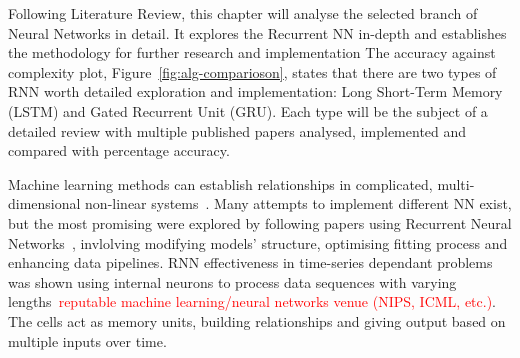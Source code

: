 %
Following Literature Review, this chapter will analyse the selected branch of Neural Networks in detail.
It explores the Recurrent NN in-depth and establishes the methodology for further research and implementation
The accuracy against complexity plot, Figure~\ref{fig:alg-comparioson}, states that there are two types of RNN worth detailed exploration and implementation: Long Short-Term Memory (LSTM) and Gated Recurrent Unit (GRU).
Each type will be the subject of a detailed review with multiple published papers analysed, implemented and compared with percentage accuracy. 

%
Machine learning methods can establish relationships in complicated, multi-dimensional non-linear systems~\cite{hansen_support_2005,anton_battery_2013,he_state_2014}.
Many attempts to implement different NN exist, but the most promising were explored by following papers using Recurrent Neural Networks~\cite{song_lithium-ion_2018,Chemali2017,mamo_long_2020,jiao_gru-rnn_2020,xiao_accurate_2019,javid_adaptive_2020,zhang_deep_2020}, invlolving modifying models' structure, optimising fitting process and enhancing data pipelines.
RNN effectiveness in time-series dependant problems was shown using internal neurons to process data sequences with varying lengths~\cite{}\textcolor{red}{reputable machine learning/neural networks venue (NIPS, ICML, etc.)}.
The cells act as memory units, building relationships and giving output based on multiple inputs over time.

